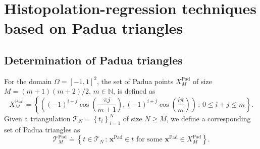 \documentclass{svjour3}
\begin{document}
\section{Histopolation-regression techniques based on Padua triangles}\label{sec2}

\subsection{Determination of Padua triangles}
For the domain $ \Omega = [-1,1]^2 $, the set of Padua points $X_M^{\mathrm{Pad}}$ of size $ M = (m+1)(m+2)/2 $, $m \in \mathbb{N}$, is defined as
\begin{equation}\label{PaduaPoints}
	X_M^{\mathrm{Pad}}=\left\{\left((-1)^{i+j}\cos\left(\frac{\pi j}{m+1}\right),(-1)^{i+j}\cos\left(\frac{i\pi}{m}\right)\right)\, : \, 0\le i+j\le m\right\} .
\end{equation}
Given a triangulation $ \mathcal{T}_N = \left\{ t_i\right\}_{i=1}^N $ of size $N \geq M$, we define a corresponding set of Padua triangles as 
\begin{equation*}\label{PaduaTriangles}
	\mathcal{T}^{\mathrm{Pad}}_M \doteq \left\{ t \in \mathcal{T}_N \, :\,  \boldsymbol{x}^{\mathrm{Pad}} \in t \text{ for some }\boldsymbol{x}^{\mathrm{Pad}} \in 	X_M^{\mathrm{Pad}}  \right\}.
\end{equation*}
\end{document}
